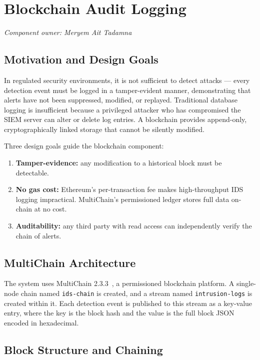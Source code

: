 \documentclass[12pt]{article}
\theoremstyle{plain}
\begin{document}
\newpage
\section{Blockchain Audit Logging}
\label{sec:blockchain}
\textit{Component owner: Meryem Ait Tadamna}

\subsection{Motivation and Design Goals}

In regulated security environments, it is not sufficient to detect attacks — every detection event must be logged in a tamper-evident manner, demonstrating that alerts have not been suppressed, modified, or replayed. Traditional database logging is insufficient because a privileged attacker who has compromised the SIEM server can alter or delete log entries. A blockchain provides append-only, cryptographically linked storage that cannot be silently modified.

Three design goals guide the blockchain component:
\begin{enumerate}
  \item \textbf{Tamper-evidence:} any modification to a historical block must be detectable.
  \item \textbf{No gas cost:} Ethereum's per-transaction fee makes high-throughput IDS logging impractical. MultiChain's permissioned ledger stores full data on-chain at no cost.
  \item \textbf{Auditability:} any third party with read access can independently verify the chain of alerts.
\end{enumerate}

\subsection{MultiChain Architecture}

The system uses MultiChain 2.3.3~\cite{multichain}, a permissioned blockchain platform. A single-node chain named \texttt{ids-chain} is created, and a stream named \texttt{intrusion-logs} is created within it. Each detection event is published to this stream as a key-value entry, where the key is the block hash and the value is the full block JSON encoded in hexadecimal.

\subsection{Block Structure and Chaining}
\end{document}

